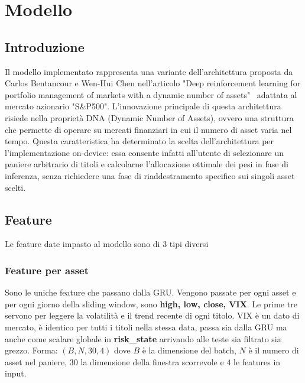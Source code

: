 \section{Modello}
\label{sec:modello}

\subsection{Introduzione}
\label{set:introduzione}
Il modello implementato rappresenta una variante dell'architettura proposta da Carlos Bentancour e Wen-Hui Chen nell'articolo "Deep reinforcement learning for portfolio management of markets with a dynamic number of assets"~\citep{betancourt2021deep} adattata al mercato azionario "S\&P500". L'innovazione principale di questa architettura risiede nella proprietà DNA (Dynamic Number of Assets), ovvero una struttura che permette di operare su mercati finanziari in cui il numero di asset varia nel tempo. Questa caratteristica ha determinato la scelta dell'architettura per l'implementazione on-device: essa consente infatti all'utente di selezionare un paniere arbitrario di titoli e calcolarne l'allocazione ottimale dei pesi in fase di inferenza, senza richiedere una fase di riaddestramento specifico sui singoli asset scelti. 

\subsection{Feature}
\label{set:feature}
Le feature date impasto al modello sono di 3 tipi diversi
\subsubsection{Feature per asset}
Sono le uniche feature che passano dalla GRU. Vengono passate per ogni asset e per ogni giorno della sliding window, sono \textbf{high, low, close, VIX}.
Le prime tre servono per leggere la volatilità e il trend recente di ogni titolo.
VIX è un dato di mercato, è identico per tutti i titoli nella stessa data, passa sia dalla GRU ma anche come scalare globale in \textbf{risk\_state} arrivando alle teste sia filtrato sia grezzo.
Forma: $(B, N, 30, 4)$ dove $B$ è la dimensione del batch, $N$ è il numero di asset nel paniere, $30$ la dimensione della finestra scorrevole e $4$ le features in input.
